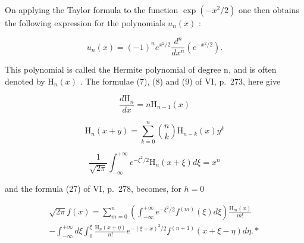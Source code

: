 On applying the Taylor formula to the function \(\exp(-x^2/2)\) one then obtains the following expression for the polynomials \(u_n(x)\) :

\[
u _ {n} (x) = (- 1) ^ {n} e ^ {x ^ {2} / 2} \frac {d ^ {n}}{d x ^ {n}} (e ^ {- x ^ {2} / 2}).
\]

This polynomial is called the Hermite polynomial of degree n, and is often denoted by \(\mathrm{H}_{n}(x)\) . The formulae (7), (8) and (9) of VI, p.~273, here give

\[
\frac {d \mathrm{H} _ {n}}{d x} = n \mathrm{H} _ {n - 1} (x)
\]

\[
\mathrm{H} _ {n} (x + y) = \sum_ {k = 0} ^ {n} {\binom {n} {k}} \mathrm{H} _ {n - k} (x)   y ^ {k}
\]

\[
\frac {1}{\sqrt {2 \pi}} \int_ {- \infty} ^ {+ \infty} e ^ {- \xi^ {2} / 2} \mathrm{H} _ {n} (x + \xi) d \xi = x ^ {n}
\]

and the formula (27) of VI, p.~278, becomes, for \(h = 0\)

\[
\begin{array}{l} \sqrt {2 \pi} f (x) = \sum_ {m = 0} ^ {n} \left(\int_ {- \infty} ^ {+ \infty} e ^ {- \xi^ {2} / 2} f ^ {(m)} (\xi) d \xi\right) \frac {\mathrm{H} _ {m} (x)}{m !} \\ - \int_ {- \infty} ^ {+ \infty} d \xi \int_ {0} ^ {\xi} \frac {\mathrm{H} _ {n} (x + \eta)}{n !} e ^ {- (\xi + x) ^ {2} / 2} f ^ {(n + 1)} (x + \xi - \eta) d \eta . * \end{array}
\]

